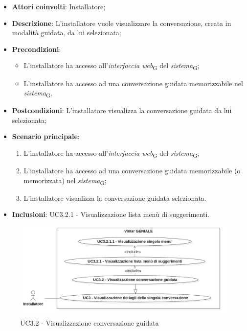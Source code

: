 \begin{itemize}
    \item \textbf{Attori coinvolti}: Installatore;
    \item \textbf{Descrizione}: L'installatore vuole visualizzare la conversazione, creata in modalità guidata, da lui selezionata;
    \item \textbf{Precondizioni}: 
    \begin{itemize}
        \item L’installatore ha accesso all’\textit{interfaccia web}\textsubscript{G} del \textit{sistema}\textsubscript{G};
        \item L’installatore ha accesso ad una conversazione guidata memorizzabile nel \textit{sistema}\textsubscript{G}.
    \end{itemize}
    \item \textbf{Postcondizioni}: L'installatore visualizza la conversazione guidata da lui selezionata;
    \item \textbf{Scenario principale}:
    \begin{enumerate}
        \item L’installatore ha accesso all’\textit{interfaccia web}\textsubscript{G} del \textit{sistema}\textsubscript{G};
        \item L’installatore ha accesso ad una conversazione guidata memorizzabile (o memorizzata) nel \textit{sistema}\textsubscript{G};
        \item L'installatore visualizza la conversazione guidata selezionata.
    \end{enumerate}
    \item \textbf{Inclusioni}: UC3.2.1 - Visualizzazione lista menù di suggerimenti.
\end{itemize}
\begin{figure}[H]
\centering
\includegraphics[width=1\textwidth]{contents/casi_duso/png/UC3.2.png}
\caption{UC3.2 - Visualizzazione conversazione guidata}
\end{figure}

